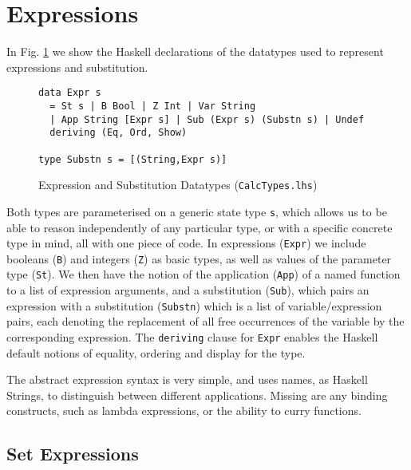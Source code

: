 \section{Expressions}\label{sec:Expressions}

In Fig. \ref{fig:expr-types} we show the Haskell declarations
of the datatypes used to represent expressions and substitution.
\begin{figure}[tb]
\begin{verbatim}
data Expr s
  = St s | B Bool | Z Int | Var String
  | App String [Expr s] | Sub (Expr s) (Substn s) | Undef
  deriving (Eq, Ord, Show)

type Substn s = [(String,Expr s)]
\end{verbatim}
  \caption{Expression and Substitution Datatypes (\texttt{CalcTypes.lhs})}
  \label{fig:expr-types}
\end{figure}
Both types are parameterised on a generic state type \texttt{s},
which allows us to be able to reason independently of any particular type, or with a specific concrete type in mind,
all with one piece of code.
In expressions (\texttt{Expr}) we include booleans (\texttt{B}) and integers (\texttt{Z}) as basic types,
as well as values of the parameter type (\texttt{St}).
We then have the notion of the application (\texttt{App}) of a named function
to a list of expression arguments,
and a substitution (\texttt{Sub}), which pairs an expression
with a substitution (\texttt{Substn}) which is a list of variable/expression pairs, each denoting the replacement of all free
occurrences of the variable by the corresponding expression.
The \texttt{deriving} clause for \texttt{Expr} enables the Haskell default notions
of equality, ordering and display for the type.

The abstract expression syntax is very simple,
and uses names, as Haskell Strings, to distinguish between
different applications.
Missing are any binding constructs, such as lambda expressions,
or the ability to curry functions.

\subsection{Set Expressions}

